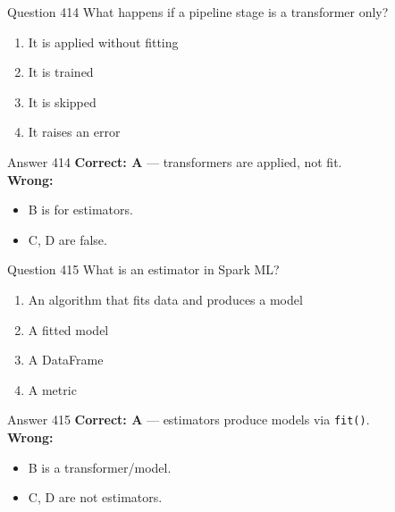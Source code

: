 \documentclass[aspectratio=169,11pt]{beamer}
\begin{document}
	\begin{frame}{Question 414}
		What happens if a pipeline stage is a transformer only?
		\begin{enumerate}[label=\Alph*.]
			\item It is applied without fitting
			\item It is trained
			\item It is skipped
			\item It raises an error
		\end{enumerate}
	\end{frame}
	\begin{frame}{Answer 414}
		\textbf{Correct: A} --- transformers are applied, not fit.\\
		\vspace{0.5em}
		\textbf{Wrong:}
		\begin{itemize}
			\item B is for estimators.
			\item C, D are false.
		\end{itemize}
	\end{frame}
	
	\begin{frame}{Question 415}
		What is an estimator in Spark ML?
		\begin{enumerate}[label=\Alph*.]
			\item An algorithm that fits data and produces a model
			\item A fitted model
			\item A DataFrame
			\item A metric
		\end{enumerate}
	\end{frame}
	\begin{frame}{Answer 415}
		\textbf{Correct: A} --- estimators produce models via \texttt{fit()}.\\
		\vspace{0.5em}
		\textbf{Wrong:}
		\begin{itemize}
			\item B is a transformer/model.
			\item C, D are not estimators.
		\end{itemize}
	\end{frame}
	
\end{document}
